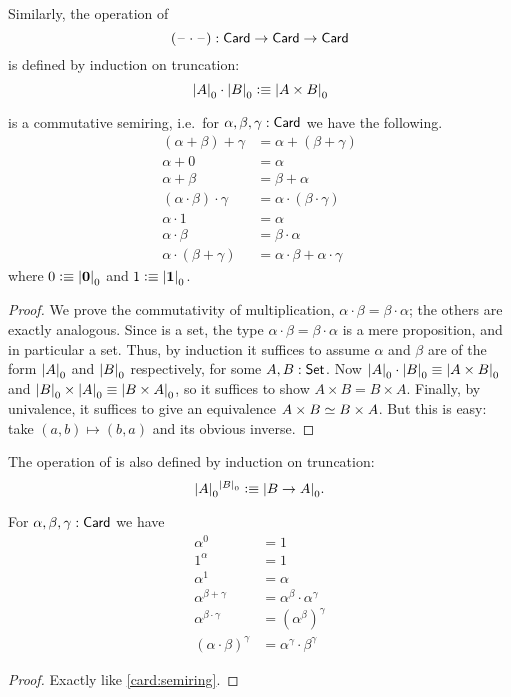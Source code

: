 \begin{defn}
  Similarly, the operation of 
  \[ (\mathord{\hspace{1pt}\text{--}\hspace{1pt}}\cdot\mathord{\hspace{1pt}\text{--}\hspace{1pt}}) : \mathsf{Card} \to \mathsf{Card} \to \mathsf{Card} \]
  is defined by induction on truncation:
  \[ \mathopen{}\left|A\right|_{0}^{}\mathclose{} \cdot \mathopen{}\left|B\right|_{0}^{}\mathclose{} \vcentcolon\equiv \mathopen{}\left|A\times B\right|_{0}^{}\mathclose{} \]
\end{defn}

\begin{lem}\label{card:semiring}
  \card is a commutative semiring, i.e.\ for $\alpha,\beta,\gamma:\mathsf{Card}$ we have the following.
  \begin{align*}
    (\alpha+\beta)+\gamma &= \alpha+(\beta+\gamma)\\
    \alpha+0 &= \alpha\\
    \alpha + \beta &= \beta + \alpha\\
    (\alpha \cdot \beta) \cdot \gamma &= \alpha \cdot (\beta\cdot\gamma)\\
    \alpha \cdot 1 &= \alpha\\
    \alpha\cdot\beta &= \beta\cdot\alpha\\
    \alpha\cdot(\beta+\gamma) &= \alpha\cdot\beta + \alpha\cdot\gamma
  \end{align*}
  where $0 \vcentcolon\equiv \mathopen{}\left|\mathbf{0}\right|_{0}^{}\mathclose{}$ and $1\vcentcolon\equiv\mathopen{}\left|\mathbf{1}\right|_{0}^{}\mathclose{}$.
\end{lem}
\begin{proof}
  We prove the commutativity of multiplication, $\alpha\cdot\beta = \beta\cdot\alpha$; the others are exactly analogous.
  Since \card is a set, the type $\alpha\cdot\beta = \beta\cdot\alpha$ is a mere proposition, and in particular a set.
  Thus, by induction it suffices to assume $\alpha$ and $\beta$ are of the form $\mathopen{}\left|A\right|_{0}^{}\mathclose{}$ and $\mathopen{}\left|B\right|_{0}^{}\mathclose{}$ respectively, for some $A,B:\mathsf{Set}$.
  Now $\mathopen{}\left|A\right|_{0}^{}\mathclose{}\cdot \mathopen{}\left|B\right|_{0}^{}\mathclose{} \equiv \mathopen{}\left|A\times B\right|_{0}^{}\mathclose{}$ and $\mathopen{}\left|B\right|_{0}^{}\mathclose{}\times\mathopen{}\left|A\right|_{0}^{}\mathclose{} \equiv \mathopen{}\left|B\times A\right|_{0}^{}\mathclose{}$, so it suffices to show $A\times B = B\times A$.
  Finally, by univalence, it suffices to give an equivalence $A\times B \simeq B\times A$.
  But this is easy: take $(a,b) \mapsto (b,a)$ and its obvious inverse.
\end{proof}

\begin{defn}
  The operation of  is also defined by induction on truncation:
  \[ \mathopen{}\left|A\right|_{0}^{}\mathclose{}^{\mathopen{}\left|B\right|_{0}^{}\mathclose{}} \vcentcolon\equiv \mathopen{}\left|B\to A\right|_{0}^{}\mathclose{}. \]
\end{defn}

\begin{lem}\label{card:exp}
  For $\alpha,\beta,\gamma:\mathsf{Card}$ we have
  \begin{align*}
    \alpha^0 &= 1\\
    1^\alpha &= 1\\
    \alpha^1 &= \alpha\\
    \alpha^{\beta+\gamma} &= \alpha^\beta \cdot \alpha^\gamma\\
    \alpha^{\beta\cdot \gamma} &= (\alpha^{\beta})^\gamma\\
    (\alpha\cdot\beta)^\gamma &= \alpha^\gamma \cdot \beta^\gamma
  \end{align*}
\end{lem}
\begin{proof}
  Exactly like \autoref{card:semiring}.
\end{proof}

